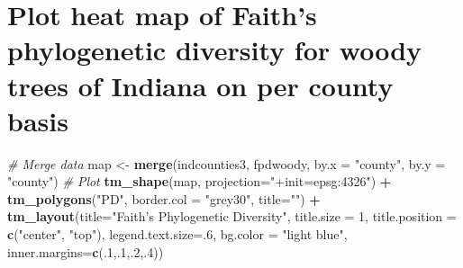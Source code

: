 \documentclass[
]{article}
\newenvironment{Shaded}{\begin{snugshade}}{\end{snugshade}}
\newcommand{\CommentTok}[1]{\textcolor[rgb]{0.56,0.35,0.01}{\textit{#1}}}
\newcommand{\DataTypeTok}[1]{\textcolor[rgb]{0.13,0.29,0.53}{#1}}
\newcommand{\DecValTok}[1]{\textcolor[rgb]{0.00,0.00,0.81}{#1}}
\newcommand{\KeywordTok}[1]{\textcolor[rgb]{0.13,0.29,0.53}{\textbf{#1}}}
\newcommand{\NormalTok}[1]{#1}
\newcommand{\OperatorTok}[1]{\textcolor[rgb]{0.81,0.36,0.00}{\textbf{#1}}}
\newcommand{\StringTok}[1]{\textcolor[rgb]{0.31,0.60,0.02}{#1}}
\begin{document}
\begin{Shaded}
\end{Shaded}

\hypertarget{plot-heat-map-of-faiths-phylogenetic-diversity-for-woody-trees-of-indiana-on-per-county-basis}{%
\section{Plot heat map of Faith's phylogenetic diversity for woody trees
of Indiana on per county
basis}\label{plot-heat-map-of-faiths-phylogenetic-diversity-for-woody-trees-of-indiana-on-per-county-basis}}

\begin{Shaded}
\begin{Highlighting}[]
\CommentTok{# Merge data}
\NormalTok{map <-}\StringTok{ }\KeywordTok{merge}\NormalTok{(indcounties3,}
\NormalTok{                     fpdwoody,}
                     \DataTypeTok{by.x =} \StringTok{"county"}\NormalTok{,}
                     \DataTypeTok{by.y =} \StringTok{"county"}\NormalTok{)}
\CommentTok{# Plot}
\KeywordTok{tm_shape}\NormalTok{(map, }\DataTypeTok{projection=}\StringTok{"+init=epsg:4326"}\NormalTok{) }\OperatorTok{+}
\StringTok{  }\KeywordTok{tm_polygons}\NormalTok{(}\StringTok{"PD"}\NormalTok{, }\DataTypeTok{border.col =} \StringTok{"grey30"}\NormalTok{, }\DataTypeTok{title=}\StringTok{""}\NormalTok{) }\OperatorTok{+}
\KeywordTok{tm_layout}\NormalTok{(}\DataTypeTok{title=}\StringTok{"Faith's Phylogenetic Diversity"}\NormalTok{, }
          \DataTypeTok{title.size =} \DecValTok{1}\NormalTok{, }
          \DataTypeTok{title.position =} \KeywordTok{c}\NormalTok{(}\StringTok{"center"}\NormalTok{, }\StringTok{"top"}\NormalTok{), }
          \DataTypeTok{legend.text.size=}\NormalTok{.}\DecValTok{6}\NormalTok{, }\DataTypeTok{bg.color =} \StringTok{"light blue"}\NormalTok{, }\DataTypeTok{inner.margins=}\KeywordTok{c}\NormalTok{(.}\DecValTok{1}\NormalTok{,.}\DecValTok{1}\NormalTok{,.}\DecValTok{2}\NormalTok{,.}\DecValTok{4}\NormalTok{))}
\end{Highlighting}
\end{Shaded}
\end{document}
